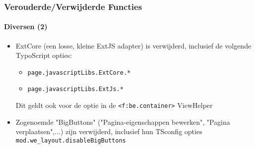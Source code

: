 \begin{frame}[fragile]
	\frametitle{Verouderde/Verwijderde Functies}
	\framesubtitle{Diversen (2)}

	\begin{itemize}

		\item ExtCore (een losse, kleine ExtJS adapter) is verwijderd, inclusief de volgende TypoScript opties:

			\begin{itemize}
				\item \texttt{page.javascriptLibs.ExtCore.*}
				\item \texttt{page.javascriptLibs.ExtJs.*}
			\end{itemize}

			Dit geldt ook voor de optie in de \texttt{<f:be.container>} ViewHelper

		\item Zogenoemde "BigButtons" ("Pagina-eigenschappen bewerken", "Pagina verplaatsen",...) zijn verwijderd,
			inclusief hun TSconfig opties \texttt{mod.we\_layout.disableBigButtons}

	\end{itemize}

\end{frame}


